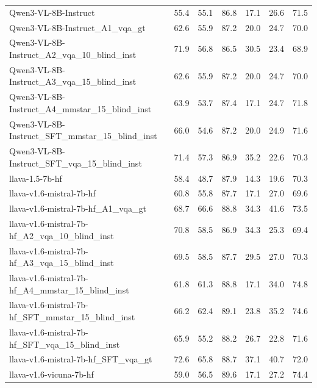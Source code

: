 \begin{tabular}{lrrrrrr}
Qwen3-VL-8B-Instruct & 55.4 & 55.1 & 86.8 & 17.1 & 26.6 & 71.5 \\
Qwen3-VL-8B-Instruct_A1_vqa_gt & 62.6 & 55.9 & 87.2 & 20.0 & 24.7 & 70.0 \\
Qwen3-VL-8B-Instruct_A2_vqa_10_blind_inst & 71.9 & 56.8 & 86.5 & 30.5 & 23.4 & 68.9 \\
Qwen3-VL-8B-Instruct_A3_vqa_15_blind_inst & 62.6 & 55.9 & 87.2 & 20.0 & 24.7 & 70.0 \\
Qwen3-VL-8B-Instruct_A4_mmstar_15_blind_inst & 63.9 & 53.7 & 87.4 & 17.1 & 24.7 & 71.8 \\
Qwen3-VL-8B-Instruct_SFT_mmstar_15_blind_inst & 66.0 & 54.6 & 87.2 & 20.0 & 24.9 & 71.6 \\
Qwen3-VL-8B-Instruct_SFT_vqa_15_blind_inst & 71.4 & 57.3 & 86.9 & 35.2 & 22.6 & 70.3 \\
llava-1.5-7b-hf & 58.4 & 48.7 & 87.9 & 14.3 & 19.6 & 70.3 \\
llava-v1.6-mistral-7b-hf & 60.8 & 55.8 & 87.7 & 17.1 & 27.0 & 69.6 \\
llava-v1.6-mistral-7b-hf_A1_vqa_gt & 68.7 & 66.6 & 88.8 & 34.3 & 41.6 & 73.5 \\
llava-v1.6-mistral-7b-hf_A2_vqa_10_blind_inst & 70.8 & 58.5 & 86.9 & 34.3 & 25.3 & 69.4 \\
llava-v1.6-mistral-7b-hf_A3_vqa_15_blind_inst & 69.5 & 58.5 & 87.7 & 29.5 & 27.0 & 70.3 \\
llava-v1.6-mistral-7b-hf_A4_mmstar_15_blind_inst & 61.8 & 61.3 & 88.8 & 17.1 & 34.0 & 74.8 \\
llava-v1.6-mistral-7b-hf_SFT_mmstar_15_blind_inst & 66.2 & 62.4 & 89.1 & 23.8 & 35.2 & 74.6 \\
llava-v1.6-mistral-7b-hf_SFT_vqa_15_blind_inst & 65.9 & 55.2 & 88.2 & 26.7 & 22.8 & 71.6 \\
llava-v1.6-mistral-7b-hf_SFT_vqa_gt & 72.6 & 65.8 & 88.7 & 37.1 & 40.7 & 72.0 \\
llava-v1.6-vicuna-7b-hf & 59.0 & 56.5 & 89.6 & 17.1 & 27.2 & 74.4 \\
\bottomrule
\end{tabular}
